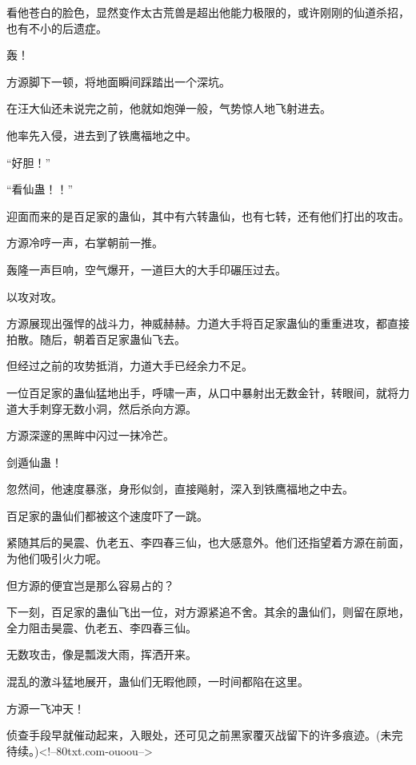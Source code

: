 \begin{this_body}
看他苍白的脸色，显然变作太古荒兽是超出他能力极限的，或许刚刚的仙道杀招，也有不小的后遗症。

轰！

方源脚下一顿，将地面瞬间踩踏出一个深坑。

在汪大仙还未说完之前，他就如炮弹一般，气势惊人地飞射进去。

他率先入侵，进去到了铁鹰福地之中。

“好胆！”

“看仙蛊！！”

迎面而来的是百足家的蛊仙，其中有六转蛊仙，也有七转，还有他们打出的攻击。

方源冷哼一声，右掌朝前一推。

轰隆一声巨响，空气爆开，一道巨大的大手印碾压过去。

以攻对攻。

方源展现出强悍的战斗力，神威赫赫。力道大手将百足家蛊仙的重重进攻，都直接拍散。随后，朝着百足家蛊仙飞去。

但经过之前的攻势抵消，力道大手已经余力不足。

一位百足家的蛊仙猛地出手，呼啸一声，从口中暴射出无数金针，转眼间，就将力道大手刺穿无数小洞，然后杀向方源。

方源深邃的黑眸中闪过一抹冷芒。

剑遁仙蛊！

忽然间，他速度暴涨，身形似剑，直接飚射，深入到铁鹰福地之中去。

百足家的蛊仙们都被这个速度吓了一跳。

紧随其后的昊震、仇老五、李四春三仙，也大感意外。他们还指望着方源在前面，为他们吸引火力呢。

但方源的便宜岂是那么容易占的？

下一刻，百足家的蛊仙飞出一位，对方源紧追不舍。其余的蛊仙们，则留在原地，全力阻击昊震、仇老五、李四春三仙。

无数攻击，像是瓢泼大雨，挥洒开来。

混乱的激斗猛地展开，蛊仙们无暇他顾，一时间都陷在这里。

方源一飞冲天！

侦查手段早就催动起来，入眼处，还可见之前黑家覆灭战留下的许多痕迹。(未完待续。)<!--80txt.com-ouoou-->

\end{this_body}

